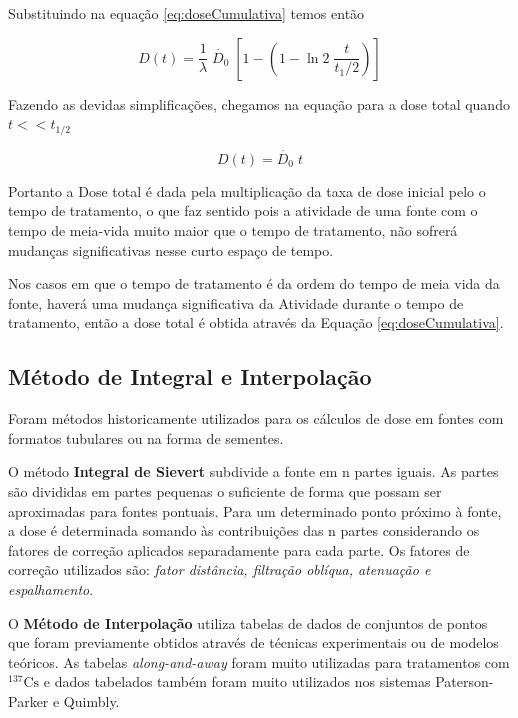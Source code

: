 \documentclass[11pt,a4paper]{article}
\begin{document}
			Substituindo na equação \ref{eq:doseCumulativa} temos então

			$$D(t) = \frac{1}{\lambda} \; \dot{D_0} \; \left[1 - \left(1 - \ln 2 \; \frac{t}{t_1/2}\right)\right]$$

			Fazendo as devidas simplificações, chegamos na equação para a dose total quando $t << t_{1/2}$

			\begin{equation}
				D(t) = \dot{D_0} \; t
				\label{eq:AproximacaoImplantesTemporarios}
			\end{equation}

			Portanto a Dose total é dada pela multiplicação da taxa de dose inicial pelo o tempo de tratamento, o que faz sentido pois a atividade de uma fonte com o tempo de meia-vida muito maior que o tempo de tratamento, não sofrerá mudanças significativas nesse curto espaço de tempo.


			Nos casos em que o tempo de tratamento é da ordem do tempo de meia vida da fonte, haverá uma mudança significativa da Atividade durante o tempo de tratamento, então a dose total é obtida através da Equação \ref{eq:doseCumulativa}.

		\subsection{Método de Integral e Interpolação}

			Foram métodos historicamente utilizados para os cálculos de dose em fontes com formatos tubulares ou na forma de sementes.

			O método \textbf{\textcolor{CarnationPink}{Integral de Sievert}} subdivide a fonte em n partes iguais. As partes são divididas em partes pequenas o suficiente de forma que possam ser aproximadas para fontes pontuais. Para um determinado ponto próximo à fonte, a dose é determinada somando às contribuições das n partes considerando os fatores de correção aplicados separadamente para cada parte. Os fatores de correção utilizados são: \textit{fator distância, filtração oblíqua, atenuação e espalhamento}.

			O \textbf{\textcolor{CarnationPink}{Método de Interpolação}} utiliza tabelas de dados de conjuntos de pontos que foram previamente obtidos através de técnicas experimentais ou de modelos teóricos. As tabelas \textit{\textcolor{CarnationPink}{along-and-away}} foram muito utilizadas para tratamentos com $\mathrm{{}^{137}Cs}$ e dados tabelados também foram muito utilizados nos sistemas Paterson-Parker e Quimbly.
\end{document}
